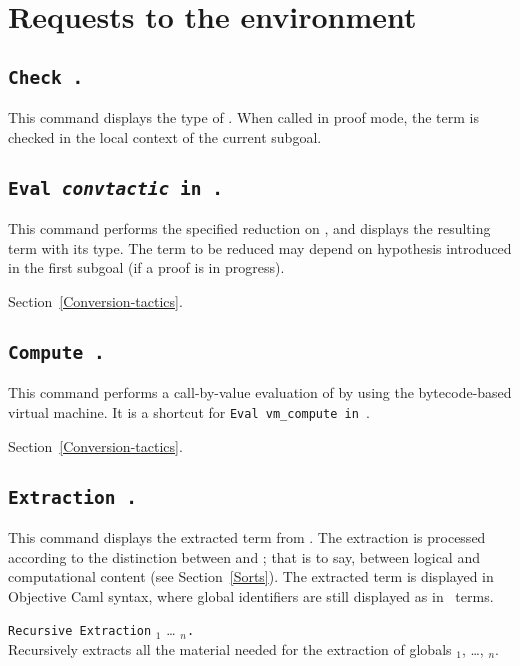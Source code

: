 \section{Requests to the environment}

\subsection[\tt Check {\term}.]{\tt Check {\term}.\label{Check}
}
This command displays the type of {\term}. When called in proof mode, 
the term is checked in the local context of the current subgoal.

\subsection[\tt Eval {\rm\sl convtactic} in {\term}.]{\tt Eval {\rm\sl convtactic} in {\term}.}

This command performs the specified reduction on {\term}, and displays
the resulting term with its type. The term to be reduced may depend on
hypothesis introduced in the first subgoal (if a proof is in
progress).

\SeeAlso Section~\ref{Conversion-tactics}.

\subsection[\tt Compute {\term}.]{\tt Compute {\term}.}

This command performs a call-by-value evaluation of {\term} by using
the bytecode-based virtual machine. It is a shortcut for
{\tt Eval vm\_compute in {\term}}.

\SeeAlso Section~\ref{Conversion-tactics}.

\subsection[\tt Extraction \term.]{\tt Extraction \term.\label{ExtractionTerm}
} 
This command displays the extracted term from
{\term}. The extraction is processed according to the distinction
between {\Set} and {\Prop}; that is to say, between logical and
computational content (see Section~\ref{Sorts}). The extracted term is
displayed in Objective Caml syntax, where global identifiers are still
displayed as in \Coq\ terms.

\begin{Variants}
\item \texttt{Recursive Extraction} {\qualid$_1$} \ldots{} {\qualid$_n$}{\tt .}\\
  Recursively extracts all the material needed for the extraction of 
  globals {\qualid$_1$}, \ldots, {\qualid$_n$}.
\end{Variants}

